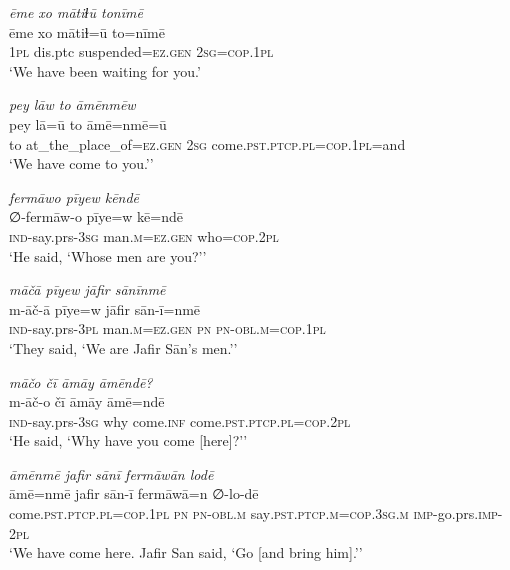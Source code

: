 \ea \label{ŠJ.31}
\textit{ēme xo mātiɫū tonīmē} \\ 
\gll ēme xo mātiɫ=ū to=nīmē \\ 
 \textsc{1pl} dis.ptc suspended\textsc{=ez.gen} \textsc{2sg}\textsc{=cop}\textsc{.\textsc{1pl}} \\ 
\glt `We have been waiting for you.'
\z 
 
\ea \label{ŠJ.32}
\textit{pey lāw to āmēnmēw} \\ 
\gll pey lā=ū to āmē=nmē=ū \\ 
 to at\_the\_place\_of\textsc{=ez.gen} \textsc{2sg} come\textsc{.pst}\textsc{.ptcp}\textsc{.pl}\textsc{=cop}\textsc{.\textsc{1pl}}=and \\ 
\glt `We have come to you.’'
\z 
 
\ea \label{ŠJ.33}
\textit{fermāwo pīyew kēndē} \\ 
\gll ∅-fermāw-o pīye=w kē=ndē \\ 
 \textsc{ind-}say.prs\textsc{-3sg} man\textsc{.m}\textsc{=ez.gen} who\textsc{=cop}.\textsc{2pl} \\ 
\glt `He said, ‘Whose men are you?’'
\z 
 
\ea \label{ŠJ.34}
\textit{māčā pīyew jāfir sānīnmē} \\ 
\gll m-āč-ā pīye=w jāfir sān-ī=nmē \\ 
 \textsc{ind-}say.prs\textsc{-3pl} man\textsc{.m}\textsc{=ez.gen} \textsc{pn} \textsc{pn}\textsc{-obl}\textsc{.m}\textsc{=cop}\textsc{.\textsc{1pl}} \\ 
\glt `They said, ‘We are Jafir Sān’s men.’'
\z 
 
\ea \label{ŠJ.35}
\textit{māčo čī āmāy āmēndē?} \\ 
\gll m-āč-o čī āmāy āmē=ndē \\ 
 \textsc{ind-}say.prs\textsc{-3sg} why come\textsc{.inf} come\textsc{.pst}\textsc{.ptcp}\textsc{.pl}\textsc{=cop}.\textsc{2pl} \\ 
\glt `He said, ‘Why have you come [here]?’'
\z 
 
\ea \label{ŠJ.36}
\textit{āmēnmē jafir sānī fermāwān lodē} \\ 
\gll āmē=nmē jafir sān-ī fermāwā=n ∅-lo-dē \\ 
 come\textsc{.pst}\textsc{.ptcp}\textsc{.pl}\textsc{=cop}\textsc{.\textsc{1pl}} \textsc{pn} \textsc{pn}\textsc{-obl}\textsc{.m} say\textsc{.pst}\textsc{.ptcp}\textsc{.m}\textsc{=cop}\textsc{.3sg}\textsc{.m} \textsc{imp-}go.prs.\textsc{imp-}\textsc{2pl} \\ 
\glt `We have come here. Jafir San said, ‘Go [and bring him].’'
\z 
 
